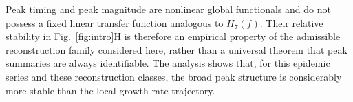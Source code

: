 Peak timing and peak magnitude are nonlinear global functionals and do not
possess a fixed linear transfer function analogous to \(H_7(f)\). Their
relative stability in Fig.~\ref{fig:intro}H is therefore an empirical
property of the admissible reconstruction family considered here, rather than
a universal theorem that peak summaries are always identifiable. The analysis
shows that, for this epidemic series and these reconstruction classes, the
broad peak structure is considerably more stable than the local growth-rate
trajectory.
